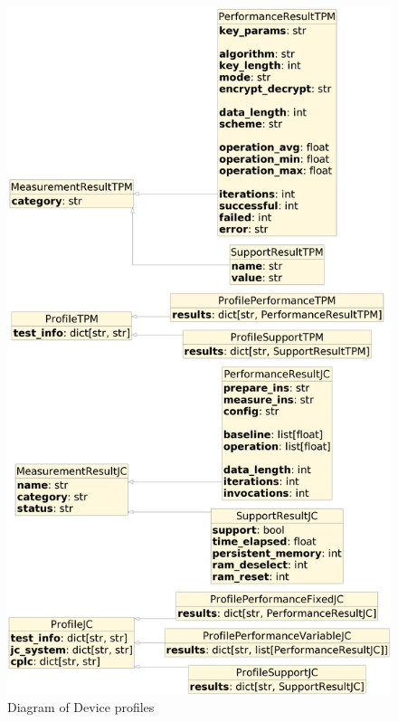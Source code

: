 \begin{figure}[H]
    \centering
    \includegraphics[width=\textwidth,height=\textheight-4.5cm, keepaspectratio]{img/diagrams/object_diagram.png}
    \caption{Diagram of Device profiles}
    \label{fig:dev-profiles-diagram}
\end{figure}

